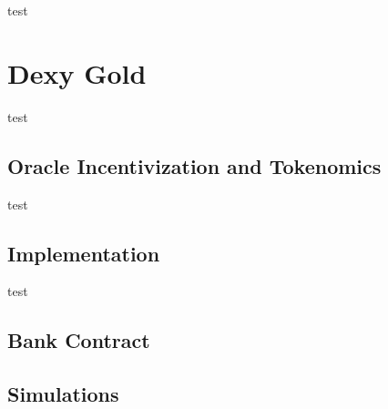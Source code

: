 \documentclass[a4paper,UKenglish,cleveref, autoref, thm-restate]{lipics-v2021}
\begin{document}
test

\section{Dexy Gold}
\label{sec:dexygold}

test

\subsection{Oracle Incentivization and Tokenomics}

test

\subsection{Implementation}

test

\subsection{Bank Contract}

\subsection{Simulations}






\end{document}
